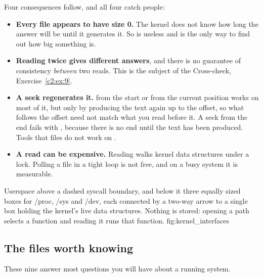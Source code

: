 Four consequences follow, and all four catch people:
\begin{itemize}
  \item \textbf{Every file appears to have size 0.} The kernel does not know how long the answer
    will be until it generates it. So  is useless and 
    is the only way to find out how big something is.
  \item \textbf{Reading twice gives different answers}, and there is no guarantee of consistency
    \emph{between} two reads. This is the subject of the Cross-check, Exercise~\ref{c2:ex:9}.
  \item \textbf{A seek regenerates it.}  from the start or from the current position
    works on most of it, but only by producing the text again up to the offset, so what follows the
    offset need not match what you read before it. A seek from the end fails with ,
    because there is no end until the text has been produced. Tools that  files do not
    work on .
  \item \textbf{A read can be expensive.} Reading  walks kernel data structures
    under a lock. Polling a  file in a tight loop is not free, and on a busy system it
    is measurable.
\end{itemize}

  {Userspace above a dashed syscall boundary, and below it three equally sized boxes for /proc, /sys
   and /dev, each connected by a two-way arrow to a single box holding the kernel's live data
   structures. Nothing is stored: opening a path selects a function and reading it runs that
   function.}
  {fig:kernel_interfaces}

\subsection{The files worth knowing}
\label{c2:app:b2}

These nine answer most questions you will have about a running system.


